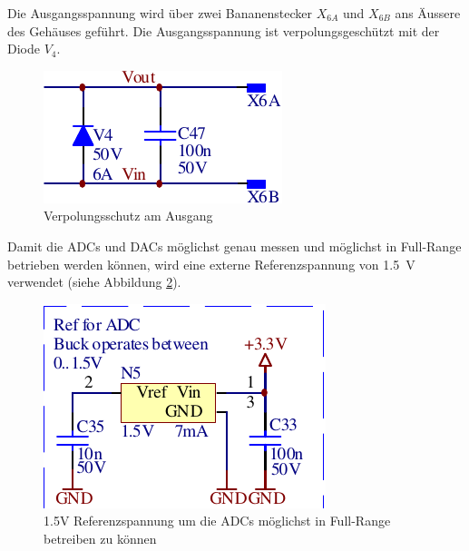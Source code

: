 Die Ausgangsspannung wird \"uber zwei  Bananenstecker  $X_{6A}$ und $X_{6B}$ ans
\"Aussere    des    Geh\"auses     gef\"uhrt.     Die    Ausgangsspannung    ist
verpolungsgesch\"utzt mit der Diode $V_4$.

\begin{figure}[th!]
    \center
    \includegraphics[width=.35\textwidth]{images/circuit/output-connectors.pdf}
    \caption{Verpolungsschutz am Ausgang}
    \label{fig:circuit:output}
\end{figure}

Damit die ADCs und DACs  m\"oglichst  genau messen und m\"oglichst in Full-Range
betrieben    werden   k\"onnen,   wird   eine   externe   Referenzspannung   von
\SI{1.5}{\volt}    verwendet     (siehe    Abbildung    \ref{fig:circuit:vref}).

\begin{figure}[th!]
    \center
    \includegraphics[width=.4\textwidth]{images/circuit/vref.pdf}
    \caption{1.5V Referenzspannung um die ADCs m\"oglichst in Full-Range betreiben zu k\"onnen}
    \label{fig:circuit:vref}
\end{figure}
